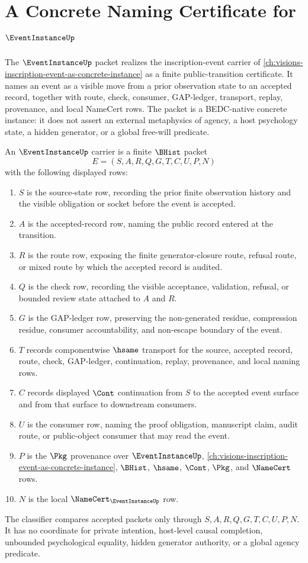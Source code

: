 \chapter{A Concrete Naming Certificate for $\EventInstanceUp$}
\label{ch:concrete-instances-event-instance-namecert}

The $\EventInstanceUp$ packet realizes the inscription-event carrier of \autoref{ch:visions-inscription-event-as-concrete-instance} as a finite public-transition certificate. It names an event as a visible move from a prior observation state to an accepted record, together with route, check, consumer, GAP-ledger, transport, replay, provenance, and local NameCert rows. The packet is a BEDC-native concrete instance: it does not assert an external metaphysics of agency, a host psychology state, a hidden generator, or a global free-will predicate.

\begin{definition}
\label{def:event-instance-carrier}
An $\EventInstanceUp$ carrier is a finite $\BHist$ packet
$$
E=(S,A,R,Q,G,T,C,U,P,N)
$$
with the following displayed rows:
\begin{enumerate}
\item $S$ is the source-state row, recording the prior finite observation history and the visible obligation or socket before the event is accepted.
\item $A$ is the accepted-record row, naming the public record entered at the transition.
\item $R$ is the route row, exposing the finite generator-closure route, refusal route, or mixed route by which the accepted record is audited.
\item $Q$ is the check row, recording the visible acceptance, validation, refusal, or bounded review state attached to $A$ and $R$.
\item $G$ is the GAP-ledger row, preserving the non-generated residue, compression residue, consumer accountability, and non-escape boundary of the event.
\item $T$ records componentwise $\hsame$ transport for the source, accepted record, route, check, GAP-ledger, continuation, replay, provenance, and local naming rows.
\item $C$ records displayed $\Cont$ continuation from $S$ to the accepted event surface and from that surface to downstream consumers.
\item $U$ is the consumer row, naming the proof obligation, manuscript claim, audit route, or public-object consumer that may read the event.
\item $P$ is the $\Pkg$ provenance over $\EventInstanceUp$, \autoref{ch:visions-inscription-event-as-concrete-instance}, $\BHist$, $\hsame$, $\Cont$, $\Pkg$, and $\NameCert$ rows.
\item $N$ is the local $\NameCert_{\EventInstanceUp}$ row.
\end{enumerate}
The classifier compares accepted packets only through $S,A,R,Q,G,T,C,U,P,N$. It has no coordinate for private intention, host-level causal completion, unbounded psychological equality, hidden generator authority, or a global agency predicate.
\end{definition}

